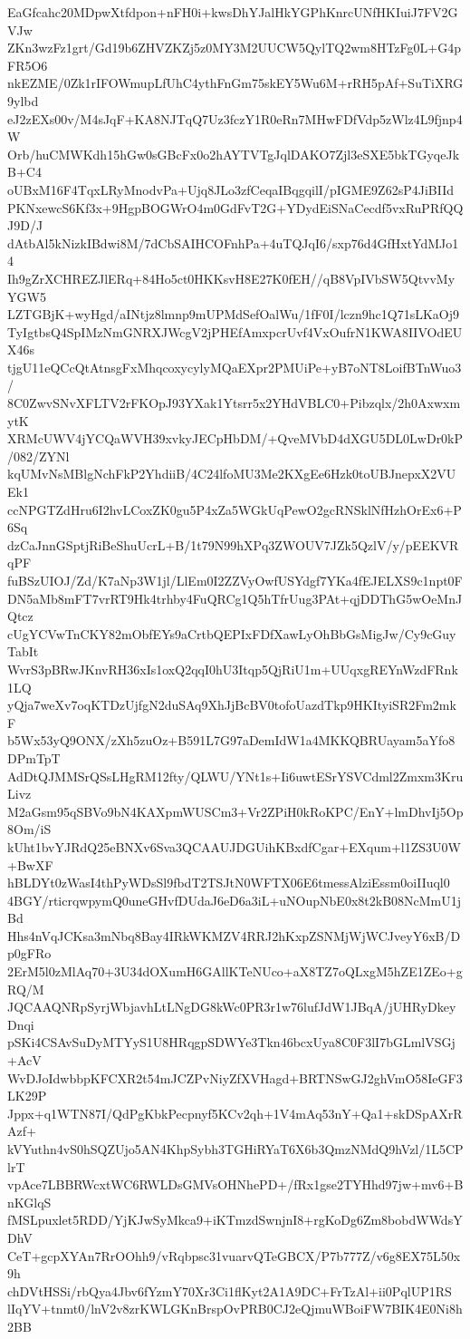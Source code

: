 EaGfcahc20MDpwXtfdpon+nFH0i+kwsDhYJalHkYGPhKnrcUNfHKIuiJ7FV2GVJw
ZKn3wzFz1grt/Gd19b6ZHVZKZj5z0MY3M2UUCW5QylTQ2wm8HTzFg0L+G4pFR5O6
nkEZME/0Zk1rIFOWmupLfUhC4ythFnGm75skEY5Wu6M+rRH5pAf+SuTiXRG9ylbd
eJ2zEXs00v/M4sJqF+KA8NJTqQ7Uz3fczY1R0eRn7MHwFDfVdp5zWlz4L9fjnp4W
Orb/huCMWKdh15hGw0sGBcFx0o2hAYTVTgJqlDAKO7Zjl3eSXE5bkTGyqeJkB+C4
oUBxM16F4TqxLRyMnodvPa+Ujq8JLo3zfCeqaIBqgqilI/pIGME9Z62sP4JiBIId
PKNxewcS6Kf3x+9HgpBOGWrO4m0GdFvT2G+YDydEiSNaCecdf5vxRuPRfQQJ9D/J
dAtbAl5kNizkIBdwi8M/7dCbSAIHCOFnhPa+4uTQJqI6/sxp76d4GfHxtYdMJo14
Ih9gZrXCHREZJlERq+84Ho5ct0HKKsvH8E27K0fEH//qB8VpIVbSW5QtvvMyYGW5
LZTGBjK+wyHgd/aINtjz8lmnp9mUPMdSefOalWu/1fF0I/lczn9hc1Q71sLKaOj9
TyIgtbsQ4SpIMzNmGNRXJWcgV2jPHEfAmxpcrUvf4VxOufrN1KWA8IIVOdEUX46s
tjgU11eQCcQtAtnsgFxMhqcoxycylyMQaEXpr2PMUiPe+yB7oNT8LoifBTnWuo3/
8C0ZwvSNvXFLTV2rFKOpJ93YXak1Ytsrr5x2YHdVBLC0+Pibzqlx/2h0AxwxmytK
XRMcUWV4jYCQaWVH39xvkyJECpHbDM/+QveMVbD4dXGU5DL0LwDr0kP/082/ZYNl
kqUMvNsMBlgNchFkP2YhdiiB/4C24lfoMU3Me2KXgEe6Hzk0toUBJnepxX2VUEk1
ccNPGTZdHru6I2hvLCoxZK0gu5P4xZa5WGkUqPewO2gcRNSklNfHzhOrEx6+P6Sq
dzCaJnnGSptjRiBeShuUcrL+B/1t79N99hXPq3ZWOUV7JZk5QzlV/y/pEEKVRqPF
fuBSzUIOJ/Zd/K7aNp3W1jl/LlEm0I2ZZVyOwfUSYdgf7YKa4fEJELXS9c1npt0F
DN5aMb8mFT7vrRT9Hk4trhby4FuQRCg1Q5hTfrUug3PAt+qjDDThG5wOeMnJQtcz
cUgYCVwTnCKY82mObfEYs9aCrtbQEPIxFDfXawLyOhBbGsMigJw/Cy9cGuyTabIt
WvrS3pBRwJKnvRH36xIs1oxQ2qqI0hU3Itqp5QjRiU1m+UUqxgREYnWzdFRnk1LQ
yQja7weXv7oqKTDzUjfgN2duSAq9XhJjBcBV0tofoUazdTkp9HKItyiSR2Fm2mkF
b5Wx53yQ9ONX/zXh5zuOz+B591L7G97aDemIdW1a4MKKQBRUayam5aYfo8DPmTpT
AdDtQJMMSrQSsLHgRM12fty/QLWU/YNt1s+Ii6uwtESrYSVCdml2Zmxm3KruLivz
M2aGsm95qSBVo9bN4KAXpmWUSCm3+Vr2ZPiH0kRoKPC/EnY+lmDhvIj5Op8Om/iS
kUht1bvYJRdQ25eBNXv6Sva3QCAAUJDGUihKBxdfCgar+EXqum+l1ZS3U0W+BwXF
hBLDYt0zWasI4thPyWDsSl9fbdT2TSJtN0WFTX06E6tmessAlziEssm0oiIIuql0
4BGY/rticrqwpymQ0uneGHvfDUdaJ6eD6a3iL+uNOupNbE0x8t2kB08NcMmU1jBd
Hhs4nVqJCKsa3mNbq8Bay4IRkWKMZV4RRJ2hKxpZSNMjWjWCJveyY6xB/Dp0gFRo
2ErM5l0zMlAq70+3U34dOXumH6GAllKTeNUco+aX8TZ7oQLxgM5hZE1ZEo+gRQ/M
JQCAAQNRpSyrjWbjavhLtLNgDG8kWc0PR3r1w76lufJdW1JBqA/jUHRyDkeyDnqi
pSKi4CSAvSuDyMTYyS1U8HRqgpSDWYe3Tkn46bcxUya8C0F3lI7bGLmlVSGj+AcV
WvDJoIdwbbpKFCXR2t54mJCZPvNiyZfXVHagd+BRTNSwGJ2ghVmO58IeGF3LK29P
Jppx+q1WTN87I/QdPgKbkPecpnyf5KCv2qh+1V4mAq53nY+Qa1+skDSpAXrRAzf+
kVYuthn4vS0hSQZUjo5AN4KhpSybh3TGHiRYaT6X6b3QmzNMdQ9hVzl/1L5CPlrT
vpAce7LBBRWcxtWC6RWLDsGMVsOHNhePD+/fRx1gse2TYHhd97jw+mv6+BnKGlqS
fMSLpuxlet5RDD/YjKJwSyMkca9+iKTmzdSwnjnI8+rgKoDg6Zm8bobdWWdsYDhV
CeT+gcpXYAn7RrOOhh9/vRqbpsc31vuarvQTeGBCX/P7b777Z/v6g8EX75L50x9h
chDVtHSSi/rbQya4Jbv6fYzmY70Xr3Ci1flKyt2A1A9DC+FrTzAl+ii0PqlUP1RS
lIqYV+tnmt0/lnV2v8zrKWLGKnBrspOvPRB0CJ2eQjmuWBoiFW7BIK4E0Ni8h2BB
